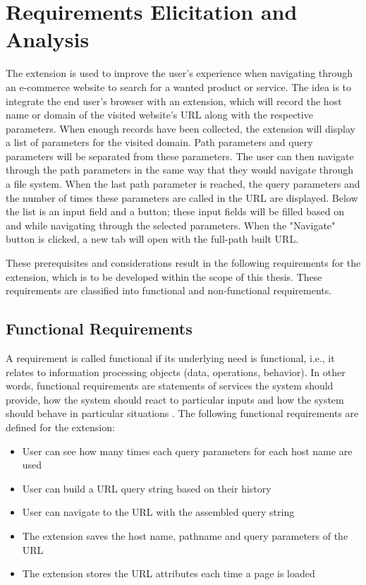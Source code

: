 \section{Requirements Elicitation and Analysis}
\label{requirements_analysis}
The extension is used to improve the user's experience when navigating through an e-commerce website to search for a wanted product or service. The idea is to integrate the end user's browser with an extension, which will record the host name or domain of the visited website's URL along with the respective parameters. When enough records have been collected, the extension will display a list of parameters for the visited domain. Path parameters and query parameters will be separated from these parameters. The user can then navigate through the path parameters in the same way that they would navigate through a file system. When the last path parameter is reached, the query parameters and the number of times these parameters are called in the URL are displayed. Below the list is an input field and a button; these input fields will be filled based on and while navigating through the selected parameters. When the "Navigate" button is clicked, a new tab will open with the full-path built URL.

These prerequisites and considerations result in the following requirements for the extension, which is to be developed within the scope of this thesis. These requirements are classified into functional and non-functional requirements.

\subsection{Functional Requirements}
A requirement is called functional if its underlying need is functional, i.e., it relates to information processing objects (data, operations, behavior). In other words, functional requirements are statements of services the system should provide, how the system should react to particular inputs and how the system should behave in particular situations \autocite{sommerville2011software}. The following functional requirements are defined for the extension:

\begin{itemize}
  \item User can see how many times each query parameters for each host name are used
  \item User can build a URL query string based on their history
  \item User can navigate to the URL with the assembled query string
  \item The extension saves the host name, pathname and query parameters of the URL
  \item The extension stores the URL attributes each time a page is loaded
\end{itemize}


